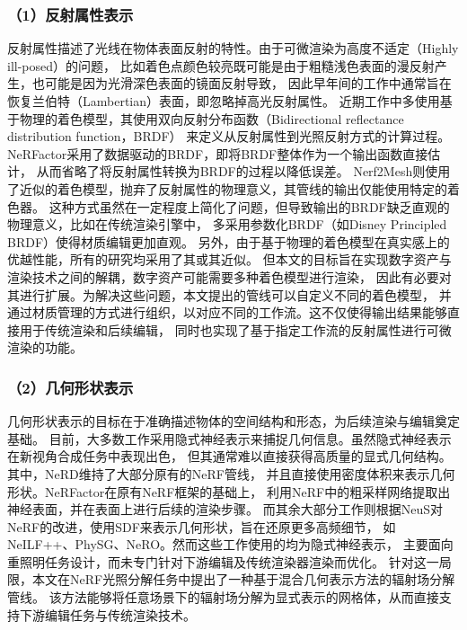 \subsubsection*{（1）反射属性表示}

反射属性描述了光线在物体表面反射的特性。由于可微渲染为高度不适定（Highly ill-posed）的问题，
比如着色点颜色较亮既可能是由于粗糙浅色表面的漫反射产生，也可能是因为光滑深色表面的镜面反射导致，
因此早年间的工作\cite{Sato_1997, Zollh_fer_2015}中通常旨在恢复兰伯特（Lambertian）表面，即忽略掉高光反射属性。
近期工作中多使用基于物理的着色模型，其使用双向反射分布函数（Bidirectional reflectance distribution function，BRDF）
\cite{Cook_1981}来定义从反射属性到光照反射方式的计算过程。
NeRFactor\cite{zhang2021nerfactor}采用了数据驱动的BRDF，即将BRDF整体作为一个输出函数直接估计，
从而省略了将反射属性转换为BRDF的过程以降低误差。
Nerf2Mesh\cite{Tang_2023}则使用了近似的着色模型，抛弃了反射属性的物理意义，其管线的输出仅能使用特定的着色器。
这种方式虽然在一定程度上简化了问题，但导致输出的BRDF缺乏直观的物理意义，比如在传统渲染引擎中，
多采用参数化BRDF（如Disney Principled BRDF\cite{burley2012physically}）使得材质编辑更加直观。
另外，由于基于物理的着色模型在真实感上的优越性能，所有的研究均采用了其或其近似。
但本文的目标旨在实现数字资产与渲染技术之间的解耦，数字资产可能需要多种着色模型进行渲染，
因此有必要对其进行扩展。为解决这些问题，本文提出的管线可以自定义不同的着色模型，
并通过材质管理的方式进行组织，以对应不同的工作流。这不仅使得输出结果能够直接用于传统渲染和后续编辑，
同时也实现了基于指定工作流的反射属性进行可微渲染的功能。

\subsubsection*{（2）几何形状表示}

几何形状表示的目标在于准确描述物体的空间结构和形态，为后续渲染与编辑奠定基础。
目前，大多数工作采用隐式神经表示来捕捉几何信息。虽然隐式神经表示在新视角合成任务中表现出色，
但其通常难以直接获得高质量的显式几何结构。其中，NeRD\cite{Boss_2021}维持了大部分原有的NeRF管线，
并且直接使用密度体积来表示几何形状。NeRFactor\cite{zhang2021nerfactor}在原有NeRF框架的基础上，
利用NeRF中的粗采样网络提取出神经表面，并在表面上进行后续的渲染步骤。
而其余大部分工作则根据NeuS\cite{10.5555/3540261.3542342}对NeRF的改进，使用SDF来表示几何形状，旨在还原更多高频细节，
如NeILF++\cite{Zhang_2023}、PhySG\cite{Zhang_2021}、NeRO\cite{Liu_2023}。然而这些工作使用的均为隐式神经表示，
主要面向重照明任务设计，而未专门针对下游编辑及传统渲染器渲染而优化。
针对这一局限，本文在NeRF光照分解任务中提出了一种基于混合几何表示方法的辐射场分解管线。
该方法能够将任意场景下的辐射场分解为显式表示的网格体，从而直接支持下游编辑任务与传统渲染技术。

